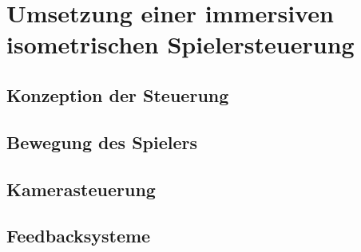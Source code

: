 \chapter{Umsetzung einer immersiven isometrischen Spielersteuerung}

\section{Konzeption der Steuerung}

\section{Bewegung des Spielers}

\section{Kamerasteuerung}

\section{Feedbacksysteme}
